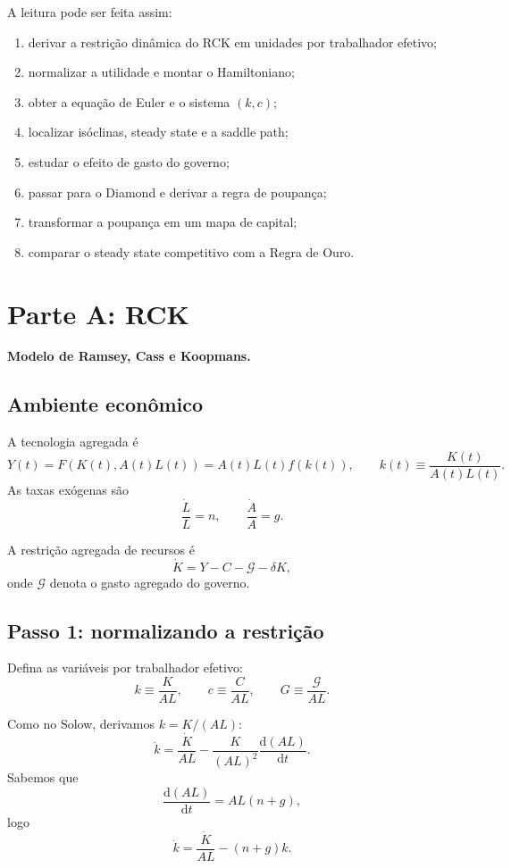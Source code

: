 \documentclass[11pt,a4paper]{article}
\newcommand{\dd}{\mathrm{d}}
\begin{document}
\begin{roteiro}
A leitura pode ser feita assim:
\begin{enumerate}
  \item derivar a restri\c{c}\~ao din\^amica do RCK em unidades por trabalhador efetivo;
  \item normalizar a utilidade e montar o Hamiltoniano;
  \item obter a equa\c{c}\~ao de Euler e o sistema \((k,c)\);
  \item localizar is\'oclinas, steady state e a saddle path;
  \item estudar o efeito de gasto do governo;
  \item passar para o Diamond e derivar a regra de poupan\c{c}a;
  \item transformar a poupan\c{c}a em um mapa de capital;
  \item comparar o steady state competitivo com a Regra de Ouro.
\end{enumerate}
\end{roteiro}

\section[Parte A: RCK]{Parte A: RCK}

\textbf{Modelo de Ramsey, Cass e Koopmans.}

\subsection{Ambiente econ\^omico}

A tecnologia agregada \'e
\[
Y(t)=F(K(t),A(t)L(t))=A(t)L(t)f(k(t)),
\qquad
k(t)\equiv \frac{K(t)}{A(t)L(t)}.
\]
As taxas ex\'ogenas s\~ao
\[
\frac{\dot L}{L}=n,
\qquad
\frac{\dot A}{A}=g.
\]

A restri\c{c}\~ao agregada de recursos \'e
\[
\dot K = Y - C - \mathcal G - \delta K,
\]
onde \(\mathcal G\) denota o gasto agregado do governo.

\subsection{Passo 1: normalizando a restri\c{c}\~ao}

Defina as vari\'aveis por trabalhador efetivo:
\[
k\equiv \frac{K}{AL},
\qquad
c\equiv \frac{C}{AL},
\qquad
G\equiv \frac{\mathcal G}{AL}.
\]

Como no Solow, derivamos \(k=K/(AL)\):
\[
\dot k
=
\frac{\dot K}{AL}
-
\frac{K}{(AL)^2}\frac{\dd(AL)}{\dd t}.
\]
Sabemos que
\[
\frac{\dd(AL)}{\dd t}=AL(n+g),
\]
logo
\[
\dot k=\frac{\dot K}{AL}-(n+g)k.
\]
\end{document}
